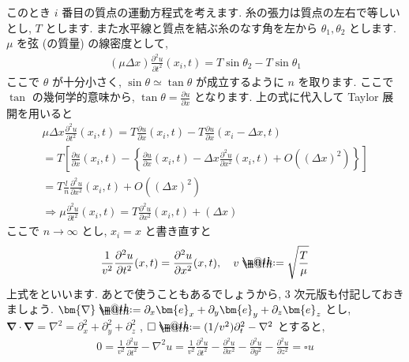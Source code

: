 \documentclass[openany, a4paper, oneside]{jsbook}
\makeatletter
\newcommand*{\defeq}{\mathrel{\rlap{%
\raisebox{0.3ex}{$\m@th\cdot$}}%
\raisebox{-0.3ex}{$\m@th\cdot$}}%
=}
\theoremstyle{break}
\theoremstyle{breakdefn}
\makeatother
\begin{document}
このとき $i$ 番目の質点の運動方程式を考えます. 糸の張力は質点の左右で等しいとし,  $T$ とします.
また水平線と質点を結ぶ糸のなす角を左から $\theta_1,\theta_2$ とします.
$\mu$ を弦 (の質量) の線密度として,
\begin{align}
( \mu \varDelta x) \frac{\partial ^2 u} {\partial t ^2} (x_i , t )
=
T \sin \theta_2 - T \sin \theta_1
\end{align}
ここで $\theta$ が十分小さく,  $\sin \theta \simeq \tan \theta$ が成立するように $n$ を取ります.
ここで $\tan$ の幾何学的意味から,  $\tan \theta = \frac {\partial u} {\partial x}$ となります.
上の式に代入して Taylor 展開を用いると
\begin{gather}
\mu \varDelta x \frac{\partial ^2 u} {\partial t ^2} (x_i , t )
=
T \frac{\partial u} {\partial x}(x_i , t) - T \frac{\partial u} {\partial x}\left ( x_i - \varDelta x , t \right) \\
=
T \left [
\frac{\partial u} {\partial x}(x_i , t)
-\left \{
\frac{\partial u} {\partial x} ( x_i , t ) - \varDelta x \frac{\partial ^2 u} {\partial x^2} ( x_i , t )
+O \left ( \left ( \varDelta x \right) ^2 \right)
\right \}
\right ]\\
=
T \frac{l} {n} \frac{\partial ^2 u} {\partial  x ^2}(x_i , t ) + O \left ( \left ( \varDelta x \right) ^2 \right)\\
\Longrightarrow
\mu \frac{\partial ^2 u} {\partial t ^2} (x_i , t )
=
T \frac{\partial ^2 u} {\partial  x ^2}(x_i , t ) + \left ( \varDelta x \right)
\end{gather}
ここで $n \to \infty$ とし,  $x_i = x$ と書き直すと
\begin{align}
\frac{1} {v^2} \frac{\partial ^2 u} {\partial t ^2} (x , t )
=
\frac{\partial ^2 u} {\partial  x ^2}(x , t ),
\quad
v \defeq \sqrt \frac{T} {\mu}
\end{align}
上式をといいます.
あとで使うこともあるでしょうから, 3 次元版も付記しておきましょう.
$\bm{\nabla} \defeq \partial _x \bm{e} _x + \partial _y \bm{e} _y + \partial _z \bm{e} _z$ とし,
$\bm{\nabla} \cdot \bm{\nabla} = \nabla ^2 = \partial _x ^2 + \partial _y ^2 +\partial _z ^2$ ,
$\square \defeq (1/v^2) \partial _t ^2 - \nabla ^2$
とすると,
\begin{align}
0
=
\frac{1} {v^2} \frac{\partial ^2 u} {\partial t ^2}
-\nabla ^2 u
=
\frac{1} {v^2} \frac{\partial ^2 u} {\partial t ^2}
-\frac{\partial ^2 u} {\partial  x ^2}
-\frac{\partial ^2 u} {\partial y ^2}
-\frac{\partial ^2 u} {\partial  z ^2}
=
\square u
\end{align}
\end{document}
